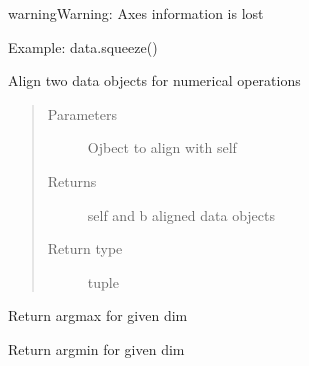 \documentclass[letterpaper,10pt,english]{sphinxmanual}
\begin{document}
\begin{fulllineitems}
\begin{fulllineitems}
\begin{sphinxadmonition}{warning}{Warning:}
Axes information is lost
\end{sphinxadmonition}

Example:
data.squeeze()

\end{fulllineitems}


\begin{fulllineitems}
\label{\detokenize{dnpData:dnpLab.dnpdata.align}}
Align two data objects for numerical operations
\begin{quote}\begin{description}
\item[{Parameters}] \leavevmode
{} \sphinxhyphen{}\sphinxhyphen{} Ojbect to align with self

\item[{Returns}] \leavevmode
self and b aligned data objects

\item[{Return type}] \leavevmode
tuple

\end{description}\end{quote}

\end{fulllineitems}


\begin{fulllineitems}
\label{\detokenize{dnpData:dnpLab.dnpdata.argmax}}
Return argmax for given dim

\end{fulllineitems}


\begin{fulllineitems}
\label{\detokenize{dnpData:dnpLab.dnpdata.argmin}}
Return argmin for given dim

\end{fulllineitems}


\end{fulllineitems}
\end{document}
